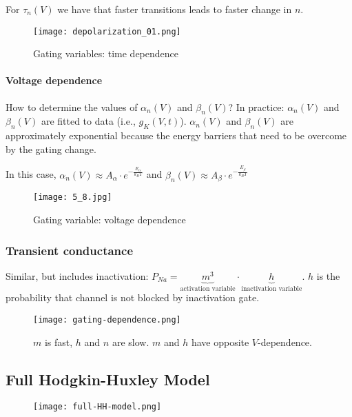 \documentclass[main]{subfiles}
\begin{document}
For $\tau_n(V)$ we have that faster transitions leads to faster change in $n$.

\begin{figure}[H]
	\centering
	\texttt{[image: depolarization\_01.png]}
	\caption{Gating variables: time dependence}
\end{figure} 

\paragraph{Voltage dependence}
How to determine the values of $\alpha_n(V)$ and $\beta_n(V)$?
In practice: $\alpha_n(V)$ and $\beta_n(V)$ are fitted to data (i.e., $g_K(V,t)$).
$\alpha_n(V)$ and $\beta_n(V)$ are approximately exponential because the energy barriers that need to be overcome by the gating change.

In this case, $\alpha_n(V) \approx A_\alpha \cdot e^{-\frac{E_\alpha}{k_B T}}$ and $\beta_n(V) \approx A_\beta \cdot e^{-\frac{E_\beta}{k_B T}}$

\begin{figure}[H]
	\centering
	\texttt{[image: 5\_8.jpg]}
	\caption{Gating variable: voltage dependence}
\end{figure} 

\subsubsection{Transient conductance}
Similar, but includes inactivation: $P_{Na} = \underbrace{m^3}_\text{activation variable} \cdot \underbrace{h}_\text{inactivation variable}$.
$h$ is the probability that channel is not blocked by inactivation gate.

\begin{figure}[H]
	\centering
	\texttt{[image: gating-dependence.png]}
	\caption{$m$ is fast, $h$ and $n$ are slow. $m$ and $h$ have opposite $V$-dependence.}
\end{figure} 

\subsection{Full Hodgkin-Huxley Model}

\begin{figure}[H]
	\centering
	\texttt{[image: full-HH-model.png]}
\end{figure} 
\end{document}
